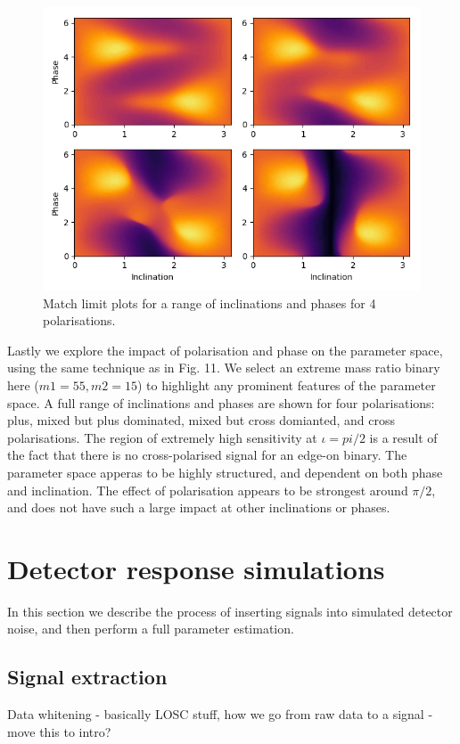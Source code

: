 \documentclass[11pt]{article}
\begin{document}
\begin{figure}[h]
	\includegraphics[scale=0.85]{fig12.png}
	\centering
	\caption{Match limit plots for a range of inclinations and phases for 4 polarisations.}
	\centering
\end{figure}

Lastly we explore the impact of polarisation and phase on the parameter space, using the same technique as in Fig. 11. We select an extreme mass ratio binary here ($m1=55, m2=15$) to highlight any prominent features of the parameter space. A full range of inclinations and phases are shown for four polarisations: plus, mixed but plus dominated, mixed but cross domianted, and cross polarisations. The region of extremely high sensitivity at $\iota=pi/2$ is a result of the fact that there is no cross-polarised signal for an edge-on binary. The parameter space apperas to be highly structured, and dependent on both phase and inclination. The effect of polarisation appears to be strongest around $\pi/2$, and does not have such a large impact at other inclinations or phases.

\section{Detector response simulations}
In this section we describe the process of inserting signals into simulated detector noise, and then perform a full parameter estimation.
\subsection{Signal extraction}
Data whitening - basically LOSC stuff, how we go from raw data to a signal - move this to intro?
\end{document}

